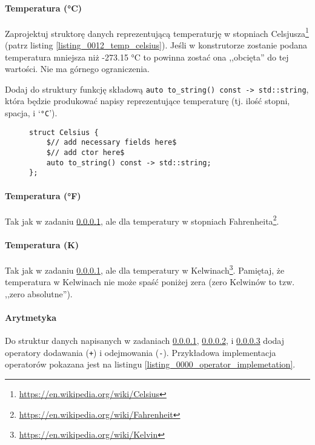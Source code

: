 \documentclass[11pt,a4paper,titlepage,onecolumn]{article}
\begin{document}
\paragraph{Temperatura (°C)}\label{ex_0000_struct_temperature_celsius}
Zaprojektuj struktorę danych reprezentującą temperaturję w stopniach
Celsjusza\footnote{\url{https://en.wikipedia.org/wiki/Celsius}} (patrz listing
\ref{listing_0012_temp_celsius}). Jeśli w konstrutorze zostanie podana
temperatura mniejsza niż -273.15 °C to powinna zostać ona ,,obcięta'' do tej
wartości. Nie ma górnego ograniczenia.

Dodaj do struktury funkcję składową \texttt{auto to\_string() const ->
std::string}, która będzie produkować napisy reprezentujące temperaturę (tj.
ilość stopni, spacja, i `\texttt{°C}').

\begin{figure}[!htp]
{\small
\begin{lstlisting}[caption={struktura reprezentująca temperaturę w °C},
    captionpos=b,
    label=listing_0012_temp_celsius]
struct Celsius {
    $// add necessary fields here$
    $// add ctor here$
    auto to_string() const -> std::string;
};
\end{lstlisting}}
\end{figure}

\paragraph{Temperatura (°F)}\label{ex_0000_struct_temperature_fahrenheit} Tak jak w zadaniu
\ref{ex_0000_struct_temperature_celsius}, ale dla temperatury w stopniach
Fahrenheita\footnote{\url{https://en.wikipedia.org/wiki/Fahrenheit}}.

\paragraph{Temperatura (K)}\label{ex_0000_struct_temperature_kelvin} Tak jak w zadaniu
\ref{ex_0000_struct_temperature_celsius}, ale dla temperatury w
Kelwinach\footnote{\url{https://en.wikipedia.org/wiki/Kelvin}}. Pamiętaj, że
temperatura w Kelwinach nie może spaść poniżej zera (zero Kelwinów to tzw.
,,zero absolutne'').

\paragraph{Arytmetyka} Do struktur danych napisanych w zadaniach
\ref{ex_0000_struct_temperature_celsius},
\ref{ex_0000_struct_temperature_fahrenheit}, i
\ref{ex_0000_struct_temperature_kelvin} dodaj operatory dodawania (\texttt{+}) i
odejmowania (\texttt{-}). Przykładowa implementacja operatorów pokazana jest na
listingu \ref{listing_0000_operator_implemetation}.
\end{document}
